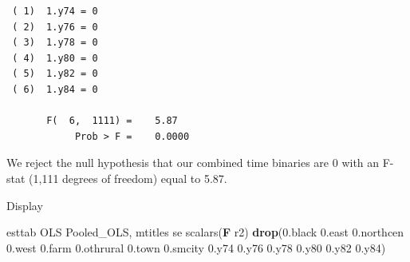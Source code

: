\documentclass[
]{book}
\newenvironment{Shaded}{\begin{snugshade}}{\end{snugshade}}
\newcommand{\BaseNTok}[1]{\textcolor[rgb]{0.00,0.00,0.81}{#1}}
\newcommand{\FunctionTok}[1]{\textcolor[rgb]{0.13,0.29,0.53}{\textbf{#1}}}
\newcommand{\KeywordTok}[1]{\textcolor[rgb]{0.13,0.29,0.53}{\textbf{#1}}}
\newcommand{\NormalTok}[1]{#1}
\begin{document}
\begin{verbatim}
 ( 1)  1.y74 = 0
 ( 2)  1.y76 = 0
 ( 3)  1.y78 = 0
 ( 4)  1.y80 = 0
 ( 5)  1.y82 = 0
 ( 6)  1.y84 = 0

       F(  6,  1111) =    5.87
            Prob > F =    0.0000
\end{verbatim}

We reject the null hypothesis that our combined time binaries are 0 with an F-stat (1,111 degrees of freedom) equal to 5.87.

Display

\begin{Shaded}
\begin{Highlighting}[]
\NormalTok{esttab OLS Pooled\_OLS, mtitles se scalars(}\FunctionTok{F}\NormalTok{ r2) }\KeywordTok{drop}\NormalTok{(0.}\BaseNTok{black}\NormalTok{ 0.east 0.northcen 0.west 0.farm 0.othrural 0.town 0.smcity 0.y74 0.y76 0.y78 0.y80 0.y82 0.y84) }
\end{Highlighting}
\end{Shaded}
\end{document}

